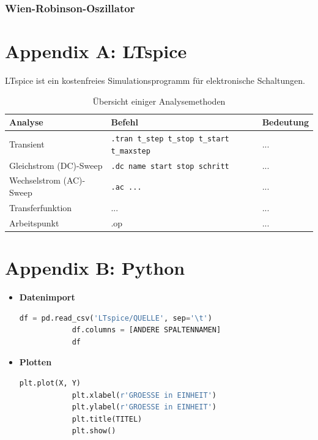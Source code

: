 \documentclass{article}
\begin{document}
\subsubsection{Wien-Robinson-Oszillator}


\newpage


\section{Appendix A: LTspice}
LTspice ist ein kostenfreies Simulationsprogramm für elektronische Schaltungen.


	\begin{table}[H]
		\centering
		\caption{Übersicht einiger Analysemethoden}
		\begin{tabular}{l|l|l}
			\hline\hline
				Analyse & Befehl & Bedeutung \\
			\hline
				Transient & \texttt{.tran t\_step t\_stop t\_start t\_maxstep} & ... \\
			\hline
				Gleichstrom (DC)-Sweep & \texttt{.dc name start stop schritt} & ... \\
			\hline
				Wechselstrom (AC)-Sweep & \texttt{.ac ...} & ... \\
			\hline
				Transferfunktion & ... & ... \\
			\hline
				Arbeitspunkt & .op & ... \\
			\hline\hline
		\end{tabular}
	\end{table}


\newpage


\section{Appendix B: Python}


	\begin{itemize}
		\item \textbf{Datenimport}
		\begin{lstlisting}[language=Python]
			df = pd.read_csv('LTspice/QUELLE', sep='\t')
			df.columns = [ANDERE SPALTENNAMEN]
			df
		\end{lstlisting}


		\item \textbf{Plotten}
		\begin{lstlisting}[language=Python]
			plt.plot(X, Y)
			plt.xlabel(r'GROESSE in EINHEIT')
			plt.ylabel(r'GROESSE in EINHEIT')
			plt.title(TITEL)
			plt.show()
		\end{lstlisting}
	\end{itemize}
\end{document}
